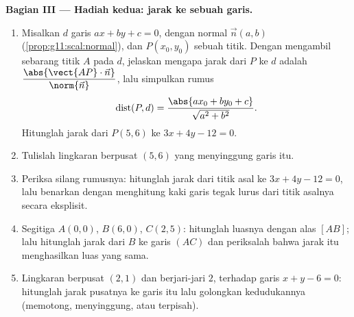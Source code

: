 \begin{problem}
\medskip
\noindent\textbf{Bagian III --- Hadiah kedua: jarak ke sebuah
garis.}
\begin{enumerate}[resume]
  \item Misalkan $d$ garis $ax + by + c = 0$, dengan  normal
        $\vec n(a, b)$ (\cref{prop:g11:scal:normal}),
        dan $P(x_0, y_0)$ sebuah titik. Dengan mengambil sebarang titik $A$
        pada $d$, jelaskan mengapa jarak dari $P$ ke $d$ adalah
        $\dfrac{\abs{\vect{AP} \cdot \vec n}}{\norm{\vec n}}$,
        lalu simpulkan rumus
        \[
        \operatorname{dist}(P, d)
        = \frac{\abs{a x_0 + b y_0 + c}}{\sqrt{a^2 + b^2}} .
        \]
        Hitunglah jarak dari $P(5, 6)$ ke
        $3x + 4y - 12 = 0$.
  \item Tulislah  lingkaran berpusat $(5, 6)$
        yang menyinggung garis itu.
  \item Periksa silang rumusnya: hitunglah jarak dari
        titik asal ke $3x + 4y - 12 = 0$, lalu benarkan dengan
        menghitung kaki garis tegak lurus dari titik asalnya
        secara eksplisit.
  \item Segitiga $A(0,0)$, $B(6,0)$, $C(2,5)$: hitunglah luasnya
        dengan alas $[AB]$; lalu hitunglah jarak dari
        $B$ ke garis $(AC)$ dan periksalah bahwa jarak itu menghasilkan luas
        yang sama.
  \item Lingkaran berpusat $(2, 1)$ dan berjari-jari $2$, terhadap
        garis $x + y - 6 = 0$: hitunglah jarak pusatnya
        ke garis itu lalu golongkan kedudukannya (memotong,
        menyinggung, atau terpisah).
\end{enumerate}


\end{problem}
